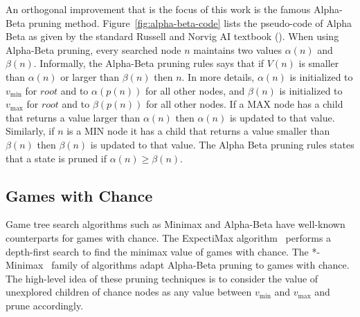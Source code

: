 \documentclass[letterpaper]{article} %
\newcommand{\MM}{\mathit{V}}
\newcommand{\vmax}{v_{\text{max}}}
\newcommand{\vmin}{v_{\text{min}}}
\newcommand{\rootnode}{\mathit{root}}
\begin{document}
An orthogonal improvement that is the focus of this work is the famous Alpha-Beta pruning method. 
Figure~\ref{fig:alpha-beta-code} lists the pseudo-code of Alpha Beta as given by the standard Russell and Norvig AI textbook (\citeyear{russell2016artificial}). 
When using Alpha-Beta pruning, every searched node $n$ maintains two values $\alpha(n)$ and $\beta(n)$. 
Informally, the Alpha-Beta pruning rules says that if $\MM(n)$ is smaller than $\alpha(n)$ or larger than $\beta(n)$ then $n$. In more details,  
$\alpha(n)$ is initialized to $\vmin$ for $\rootnode{}$ and to $\alpha(p(n))$ for all other nodes, and $\beta(n)$ is initialized to $\vmax$ for $\rootnode{}$ and to $\beta(p(n))$ for all other nodes. If a MAX node has a child that returns a value larger than $\alpha(n)$ then $\alpha(n)$ is updated to that value. Similarly, if $n$ is a MIN node it has a child that returns a value smaller than $\beta(n)$ then $\beta(n)$ is updated to that value. The Alpha Beta pruning rules states that a state is pruned if $\alpha(n)\geq \beta(n)$.





\subsection{Games with Chance}
Game tree search algorithms such as Minimax and Alpha-Beta have well-known counterparts for games with chance.
The ExpectiMax algorithm~\cite{michie1966game} performs a depth-first search to find the minimax value of games with chance.
The *-Minimax~\cite{ballard1983minimax} family of algorithms adapt Alpha-Beta pruning to games with chance. The high-level idea of these pruning techniques is to consider the value of unexplored children of chance nodes as any value between $\vmin$ and $\vmax$ and prune accordingly. 
\end{document}
